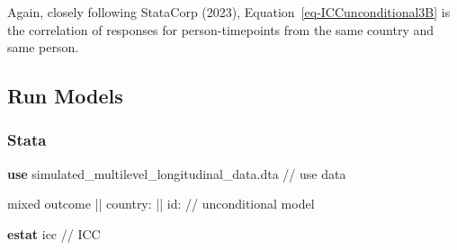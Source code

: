 \documentclass[
  letterpaper,
  DIV=11,
  numbers=noendperiod]{scrreprt}
\newenvironment{Shaded}{\begin{snugshade}}{\end{snugshade}}
\newcommand{\CommentTok}[1]{\textcolor[rgb]{0.37,0.37,0.37}{#1}}
\newcommand{\KeywordTok}[1]{\textcolor[rgb]{0.00,0.23,0.31}{\textbf{#1}}}
\newcommand{\NormalTok}[1]{\textcolor[rgb]{0.00,0.23,0.31}{#1}}
\begin{document}
Again, closely following StataCorp (2023),
Equation~\ref{eq-ICCunconditional3B} is the correlation of responses for
person-timepoints from the same country and same person.

\subsection{Run Models}\label{run-models-1}

\subsubsection{Stata}

\begin{Shaded}
\begin{Highlighting}[]

\KeywordTok{use}\NormalTok{ simulated\_multilevel\_longitudinal\_data.dta }\CommentTok{// use data}

\NormalTok{mixed outcome || country: || id: }\CommentTok{// unconditional model}
  
\KeywordTok{estat}\NormalTok{ icc }\CommentTok{// ICC}
\end{Highlighting}
\end{Shaded}
\end{document}
